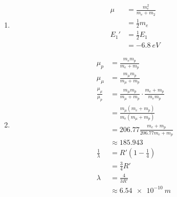 \documentclass{article}
\begin{document}
\begin{enumerate}
  \item

        \begin{align*}
          \mu  & = \frac{m_e^2}{m_e + m_2} \\
               & = \frac{1}{2} m_e         \\
          E_1' & = \frac{1}{2} E_1         \\
               & = \qty{-6.8}{eV}
        \end{align*}

  \item

        \begin{align*}
          \mu_p                 & = \frac{m_e m_p}{m_e + m_p}                                     \\
          \mu_\mu               & = \frac{m_\mu m_p}{m_\mu + m_p}                                 \\
          \frac{\mu_\mu}{\mu_p} & = \frac{m_\mu m_p}{m_\mu + m_p} \cdot \frac{m_e + m_p}{m_e m_p} \\
                                & = \frac{m_\mu (m_e + m_p)}{m_e (m_\mu + m_p)}                   \\
                                & = 206.77 \frac{m_e + m_p}{206.77 m_e + m_p}                     \\
                                & \approx 185.943                                                 \\
          \frac{1}{\lambda}     & = R' \left( 1 - \frac{1}{4} \right)                             \\
                                & = \frac{3}{4} R'                                                \\
          \lambda               & = \frac{4}{3 R'}                                                \\
                                & \approx \qty{6.54e-10}{m}
        \end{align*}
\end{enumerate}

\setcounter{subsection}{3}
\subsection{}
\end{document}
